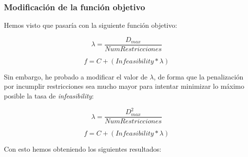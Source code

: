 \documentclass[12pt, spanish]{article}
\begin{document}
\subsubsection{Modificación de la función objetivo}

Hemos visto que pasaría con la siguiente función objetivo:

$$ \lambda = \frac{D_{max}}{NumRestricciones} $$ 

$$ f = C + (\textit{Infeasibility} * \lambda) $$ 

Sin embargo, he probado a modificar el valor de $\lambda$, de forma que la penalización por incumplir restricciones sea mucho mayor para intentar minimizar lo máximo posible la tasa de \textit{infeasibility}:


$$ \lambda = \frac{D_{max}^2}{NumRestricciones} $$ 

$$ f = C + (\textit{Infeasibility} * \lambda) $$ 



Con esto hemos obteniendo los siguientes resultados:
\end{document}
